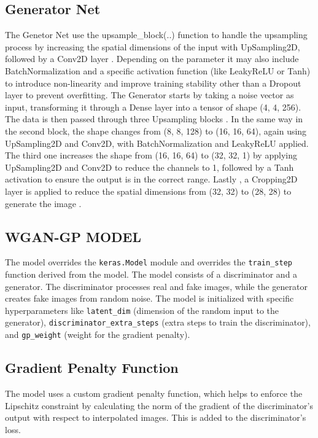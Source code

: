 \subsection*{Generator Net} 
The Genetor Net use the upsample\_block(..) function 
to handle the upsampling process by increasing the spatial 
dimensions of the input with UpSampling2D, followed by a Conv2D layer .
Depending on the parameter it may also include BatchNormalization 
and a specific activation function (like LeakyReLU or Tanh) 
to introduce non-linearity and improve training stability other
than a Dropout layer to prevent overfitting.
The Generator starts by taking a noise vector as input, 
transforming it through a Dense layer into a tensor of shape 
(4, 4, 256). 
The data is then passed through three Upsampling blocks .
In the same way in the second block, the shape changes from (8, 8, 128) 
to (16, 16, 64), again using UpSampling2D and Conv2D, 
with BatchNormalization and LeakyReLU applied.
The third one  increases the shape from (16, 16, 64) 
to (32, 32, 1) by applying UpSampling2D and Conv2D 
to reduce the channels to 1, followed by a Tanh activation 
to ensure the output is in the correct range.
Lastly , a Cropping2D layer is applied to reduce the spatial 
dimensions from (32, 32) to (28, 28) to generate the image .
\subsection*{WGAN-GP MODEL}
The model overrides the \texttt{keras.Model} module and overrides the 
\texttt{train\_step} function derived from the model. 
The model consists of a discriminator and a generator. 
The discriminator processes real and fake images, 
while the generator creates fake images from random noise.
The model is initialized with specific hyperparameters like 
\texttt{latent\_dim} (dimension of the random input to the generator),
\texttt{discriminator\_extra\_steps} (extra steps to train the 
discriminator), and 
\texttt{gp\_weight} (weight for the gradient penalty).

\subsection*{Gradient Penalty Function}
The model uses a custom gradient penalty function, 
which helps to enforce the Lipschitz constraint by calculating the norm of the gradient of the discriminator's output with respect to interpolated images. This is added to the discriminator's loss.


